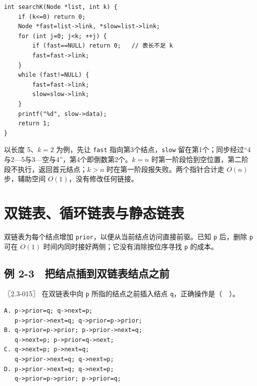 \par\medskip\noindent
\begin{minipage}{\linewidth}
\begin{verbatim}
int searchK(Node *list, int k) {
    if (k<=0) return 0;
    Node *fast=list->link, *slow=list->link;
    for (int j=0; j<k; ++j) {
        if (fast==NULL) return 0;   // 表长不足 k
        fast=fast->link;
    }
    while (fast!=NULL) {
        fast=fast->link;
        slow=slow->link;
    }
    printf("%d", slow->data);
    return 1;
}
\end{verbatim}
\end{minipage}\par\medskip

以长度 5、\(k=2\) 为例，先让 \texttt{fast} 指向第3个结点，\texttt{slow} 留在第1个；同步经过``4与2---5与3---空与4''，第4个即倒数第2个。\(k=n\) 时第一阶段恰到空位置，第二阶段不执行，返回首元结点；\(k>n\) 时在第一阶段报失败。两个指针合计走 \(O(n)\) 步，辅助空间 \(O(1)\)，没有修改任何链接。

\section{双链表、循环链表与静态链表}\label{ds-02-04}

双链表为每个结点增加 \texttt{prior}，以便从当前结点访问直接前驱。已知 \texttt{p} 后，删除 \texttt{p} 可在 \(O(1)\) 时间内同时接好两侧；它没有消除按位序寻找 \texttt{p} 的成本。

\subsection{例 2-3　把结点插到双链表结点之前}\label{ds-ex2-3}

\noindent{}〖2.3-015〗 在双链表中向 \texttt{p} 所指的结点之前插入结点 \texttt{q}，正确操作是（　）。

\par\medskip\noindent
\begin{minipage}{\linewidth}
\begin{verbatim}
A. p->prior=q; q->next=p;
   p->prior->next=q; q->prior=p->prior;
B. q->prior=p->prior; p->prior->next=q;
   q->next=p; p->prior=q->next;
C. q->next=p; p->next=q;
   q->prior->next=q; q->next=p;
D. p->prior->next=q; q->next=p;
   q->prior=p->prior; p->prior=q;
\end{verbatim}
\end{minipage}\par\medskip


